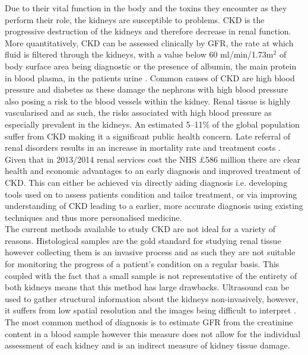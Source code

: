 Due to their vital function in the body and the toxins they encounter as they perform their role, the kidneys are susceptible to problems. \ac{CKD} is the progressive destruction of the kidneys and therefore decrease in renal function. More quantitatively, \ac{CKD} can be assessed clinically by \ac{GFR}, the rate at which fluid is filtered through the kidneys, with a value below 60 ml/min/1.73m$^2$ of body surface area being diagnostic or the presence of albumin, the main protein in blood plasma, in the patients urine \cite{stevens_assessing_2006, farrugia_albumin_2010, pruijm_blood_2017}. Common causes of \ac{CKD} are high blood pressure and diabetes as these damage the nephrons with high blood pressure also posing a risk to the blood vessels within the kidney. Renal tissue is highly vascularised and as such, the risks associated with high blood pressure as especially prevalent in the kidneys. An estimated 5–11\% of the global population suffer from \ac{CKD} \cite{coresh_prevalence_2003, de_lusignan_identifying_2005, drey_population-based_2003, amato_prevalence_2005, chadban_prevalence_2003} making it a significant public health concern. Late referral of renal disorders results in an increase in mortality rate and treatment costs \cite{jungers_late_1993, sesso_late_1996, klebe_cost_2007}. Given that in 2013/2014 renal services cost the \ac{NHS} \pounds 586 million \cite{precious_nhs_2015} there are clear health and economic advantages to an early diagnosis and improved treatment of \ac{CKD}. This can either be achieved via directly aiding diagnosis i.e. developing tools used on to assess patients condition and tailor treatment, or via improving understanding of \ac{CKD} leading to a earlier, more accurate diagnosis using existing techniques and thus more personalised medicine.\\

The current methods available to study \ac{CKD} are not ideal for a variety of reasons. Histological samples are the gold standard for studying renal tissue however collecting them is an invasive process and as such they are not suitable for monitoring the progress of a patient's condition on a regular basis. This coupled with the fact that a small sample is not representative of the entirety of both kidneys means that this method  has large drawbacks. Ultrasound can be used to gather structural information about the kidneys non-invasively, however, it suffers from low spatial resolution and the images being difficult to interpret \cite{hansen_ultrasonography_2015}. The most common method of diagnosis is to estimate \ac{GFR} from the creatinine content in a blood sample however this measure does not allow for the individual assessment of each kidney and is an indirect measure of kidney tissue damage.\\

